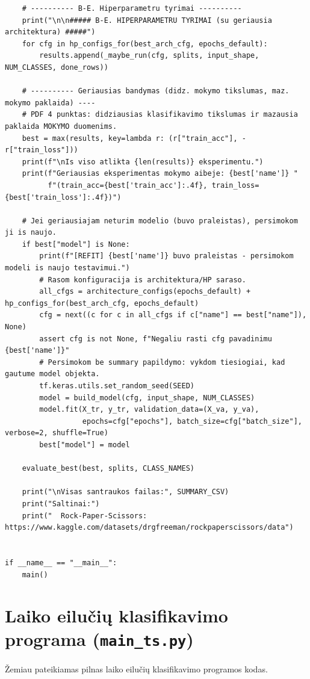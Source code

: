 \documentclass[]{VUMIFTemplateClass}
\begin{document}
\begin{verbatim}
    # ---------- B-E. Hiperparametru tyrimai ----------
    print("\n\n##### B-E. HIPERPARAMETRU TYRIMAI (su geriausia architektura) #####")
    for cfg in hp_configs_for(best_arch_cfg, epochs_default):
        results.append(_maybe_run(cfg, splits, input_shape, NUM_CLASSES, done_rows))

    # ---------- Geriausias bandymas (didz. mokymo tikslumas, maz. mokymo paklaida) ----
    # PDF 4 punktas: didziausias klasifikavimo tikslumas ir mazausia paklaida MOKYMO duomenims.
    best = max(results, key=lambda r: (r["train_acc"], -r["train_loss"]))
    print(f"\nIs viso atlikta {len(results)} eksperimentu.")
    print(f"Geriausias eksperimentas mokymo aibeje: {best['name']} "
          f"(train_acc={best['train_acc']:.4f}, train_loss={best['train_loss']:.4f})")

    # Jei geriausiajam neturim modelio (buvo praleistas), persimokom ji is naujo.
    if best["model"] is None:
        print(f"[REFIT] {best['name']} buvo praleistas - persimokom modeli is naujo testavimui.")
        # Rasom konfiguracija is architektura/HP saraso.
        all_cfgs = architecture_configs(epochs_default) + hp_configs_for(best_arch_cfg, epochs_default)
        cfg = next((c for c in all_cfgs if c["name"] == best["name"]), None)
        assert cfg is not None, f"Negaliu rasti cfg pavadinimu {best['name']}"
        # Persimokom be summary papildymo: vykdom tiesiogiai, kad gautume model objekta.
        tf.keras.utils.set_random_seed(SEED)
        model = build_model(cfg, input_shape, NUM_CLASSES)
        model.fit(X_tr, y_tr, validation_data=(X_va, y_va),
                  epochs=cfg["epochs"], batch_size=cfg["batch_size"], verbose=2, shuffle=True)
        best["model"] = model

    evaluate_best(best, splits, CLASS_NAMES)

    print("\nVisas santraukos failas:", SUMMARY_CSV)
    print("Saltinai:")
    print("  Rock-Paper-Scissors: https://www.kaggle.com/datasets/drgfreeman/rockpaperscissors/data")


if __name__ == "__main__":
    main()

\end{verbatim}


\section{\phantom{Priedas} Laiko eilučių klasifikavimo programa (\texttt{main\_ts.py})}\label{app:mainTs}

Žemiau pateikiamas pilnas laiko eilučių klasifikavimo programos kodas.
\end{document}
